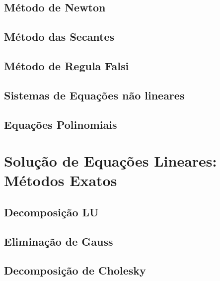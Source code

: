 \documentclass[
]{book}
\begin{document}
\hypertarget{muxe9todo-de-newton}{%
\subsection{Método de Newton}\label{muxe9todo-de-newton}}

\hypertarget{muxe9todo-das-secantes}{%
\subsection{Método das Secantes}\label{muxe9todo-das-secantes}}

\hypertarget{muxe9todo-de-regula-falsi}{%
\subsection{Método de Regula Falsi}\label{muxe9todo-de-regula-falsi}}

\hypertarget{sistemas-de-equauxe7uxf5es-nuxe3o-lineares}{%
\subsection{Sistemas de Equações não lineares}\label{sistemas-de-equauxe7uxf5es-nuxe3o-lineares}}

\hypertarget{equauxe7uxf5es-polinomiais}{%
\subsection{Equações Polinomiais}\label{equauxe7uxf5es-polinomiais}}

\hypertarget{soluuxe7uxe3o-de-equauxe7uxf5es-lineares-muxe9todos-exatos}{%
\section{Solução de Equações Lineares: Métodos Exatos}\label{soluuxe7uxe3o-de-equauxe7uxf5es-lineares-muxe9todos-exatos}}

\hypertarget{decomposiuxe7uxe3o-lu}{%
\subsection{Decomposição LU}\label{decomposiuxe7uxe3o-lu}}

\hypertarget{eliminauxe7uxe3o-de-gauss}{%
\subsection{Eliminação de Gauss}\label{eliminauxe7uxe3o-de-gauss}}

\hypertarget{decomposiuxe7uxe3o-de-cholesky}{%
\subsection{Decomposição de Cholesky}\label{decomposiuxe7uxe3o-de-cholesky}}
\end{document}
